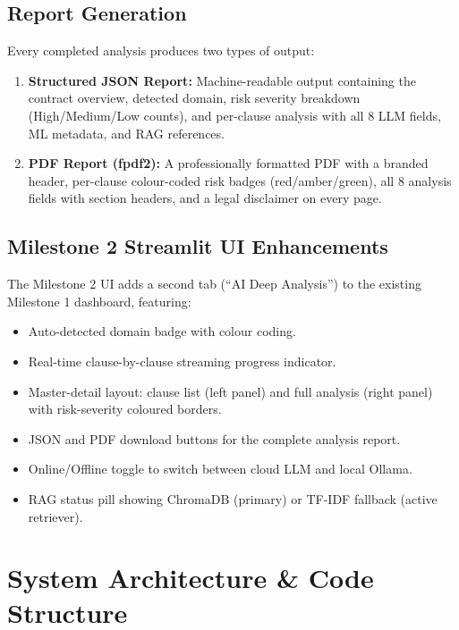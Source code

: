 \documentclass[12pt,a4paper]{article}
\begin{document}
\subsection{Report Generation}

Every completed analysis produces two types of output:

\begin{enumerate}
    \item \textbf{Structured JSON Report:} Machine-readable output containing the
    contract overview, detected domain, risk severity breakdown (High/Medium/Low
    counts), and per-clause analysis with all 8 LLM fields, ML metadata, and RAG
    references.

    \item \textbf{PDF Report (fpdf2):} A professionally formatted PDF with a branded
    header, per-clause colour-coded risk badges (red/amber/green), all 8 analysis
    fields with section headers, and a legal disclaimer on every page.
\end{enumerate}

\subsection{Milestone 2 Streamlit UI Enhancements}

The Milestone 2 UI adds a second tab (``AI Deep Analysis'') to the existing
Milestone 1 dashboard, featuring:

\begin{itemize}[leftmargin=1.5cm]
    \item Auto-detected domain badge with colour coding.
    \item Real-time clause-by-clause streaming progress indicator.
    \item Master-detail layout: clause list (left panel) and full analysis (right panel)
    with risk-severity coloured borders.
    \item JSON and PDF download buttons for the complete analysis report.
    \item Online/Offline toggle to switch between cloud LLM and local Ollama.
    \item RAG status pill showing ChromaDB (primary) or TF-IDF fallback (active retriever).
\end{itemize}

\section{System Architecture \& Code Structure}
\label{sec:architecture}
\end{document}

